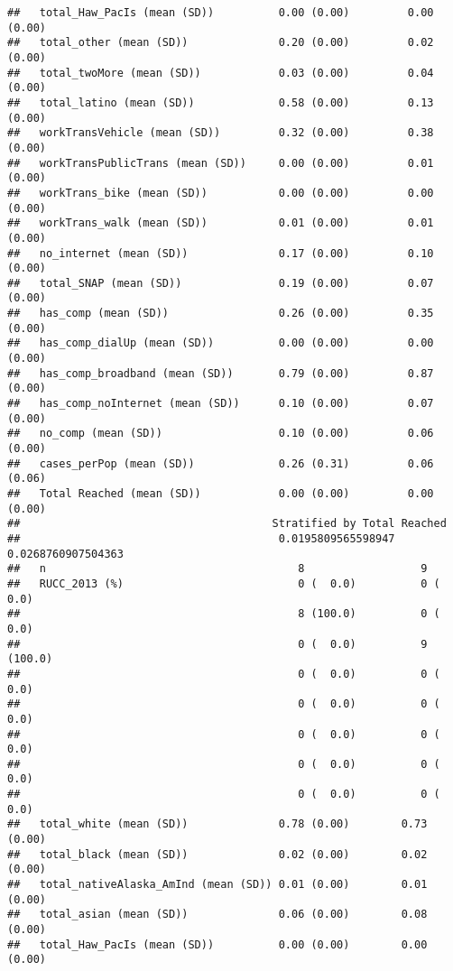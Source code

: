 \documentclass[
]{article}
\begin{document}
\begin{verbatim}
##   total_Haw_PacIs (mean (SD))          0.00 (0.00)         0.00 (0.00)        
##   total_other (mean (SD))              0.20 (0.00)         0.02 (0.00)        
##   total_twoMore (mean (SD))            0.03 (0.00)         0.04 (0.00)        
##   total_latino (mean (SD))             0.58 (0.00)         0.13 (0.00)        
##   workTransVehicle (mean (SD))         0.32 (0.00)         0.38 (0.00)        
##   workTransPublicTrans (mean (SD))     0.00 (0.00)         0.01 (0.00)        
##   workTrans_bike (mean (SD))           0.00 (0.00)         0.00 (0.00)        
##   workTrans_walk (mean (SD))           0.01 (0.00)         0.01 (0.00)        
##   no_internet (mean (SD))              0.17 (0.00)         0.10 (0.00)        
##   total_SNAP (mean (SD))               0.19 (0.00)         0.07 (0.00)        
##   has_comp (mean (SD))                 0.26 (0.00)         0.35 (0.00)        
##   has_comp_dialUp (mean (SD))          0.00 (0.00)         0.00 (0.00)        
##   has_comp_broadband (mean (SD))       0.79 (0.00)         0.87 (0.00)        
##   has_comp_noInternet (mean (SD))      0.10 (0.00)         0.07 (0.00)        
##   no_comp (mean (SD))                  0.10 (0.00)         0.06 (0.00)        
##   cases_perPop (mean (SD))             0.26 (0.31)         0.06 (0.06)        
##   Total Reached (mean (SD))            0.00 (0.00)         0.00 (0.00)        
##                                       Stratified by Total Reached
##                                        0.0195809565598947 0.0268760907504363
##   n                                       8                  9              
##   RUCC_2013 (%)                           0 (  0.0)          0 (  0.0)      
##                                           8 (100.0)          0 (  0.0)      
##                                           0 (  0.0)          9 (100.0)      
##                                           0 (  0.0)          0 (  0.0)      
##                                           0 (  0.0)          0 (  0.0)      
##                                           0 (  0.0)          0 (  0.0)      
##                                           0 (  0.0)          0 (  0.0)      
##                                           0 (  0.0)          0 (  0.0)      
##   total_white (mean (SD))              0.78 (0.00)        0.73 (0.00)       
##   total_black (mean (SD))              0.02 (0.00)        0.02 (0.00)       
##   total_nativeAlaska_AmInd (mean (SD)) 0.01 (0.00)        0.01 (0.00)       
##   total_asian (mean (SD))              0.06 (0.00)        0.08 (0.00)       
##   total_Haw_PacIs (mean (SD))          0.00 (0.00)        0.00 (0.00)       

\end{verbatim}
\end{document}
